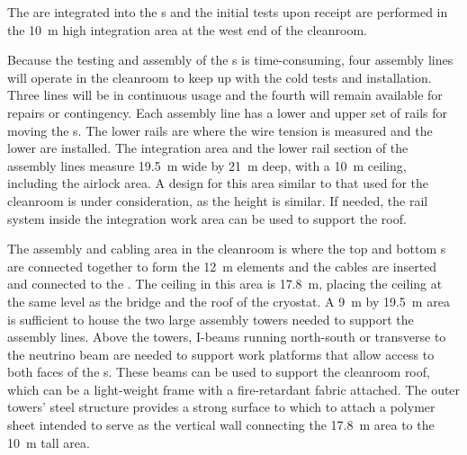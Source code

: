 The  are integrated into the s and the initial  tests upon receipt are performed in the \SI{10}{m} high  integration area at the west end of the cleanroom. 


Because the testing and assembly of the s %
 is time-consuming, %
four assembly lines will operate in the  cleanroom %
to keep up with the %
cold tests and installation. 
Three lines will be in continuous usage and the fourth will remain available for repairs or contingency. 
Each assembly line has a lower and upper set of rails for moving the s. The lower rails are where the wire tension is measured and the lower   are installed.  The  integration area and the lower rail section of the assembly lines measure \SI{19.5}{m} wide by \SI{21}{m} deep, with a \SI{10}{m} ceiling, including the airlock area. A design for this area similar to that used for the  cleanroom is under consideration, as the height is similar.  If needed, the rail system inside the integration work area can be used to support the roof.
 
The  assembly and cabling area in the cleanroom is where the top and bottom s are connected together to form the \SI{12}{m} elements %
and the  cables are inserted and connected to the . 
The ceiling in this area is \SI{17.8}{m}, placing the ceiling at the same level as the bridge and the roof of the cryostat. 
A \SI{9}{m} by \SI{19.5}{m} area is sufficient to house the two large assembly towers needed to support the assembly lines. Above the towers, I-beams running north-south or transverse to the neutrino beam are needed to support work platforms that allow access to both faces of the s. These beams can be used to support the cleanroom roof, which can be a light-weight frame with a fire-retardant fabric attached. 
The outer towers' steel structure provides a strong surface to which to attach a polymer sheet intended to serve as the vertical wall connecting the \SI{17.8}{m} %
area to the \SI{10}{m} tall area.

